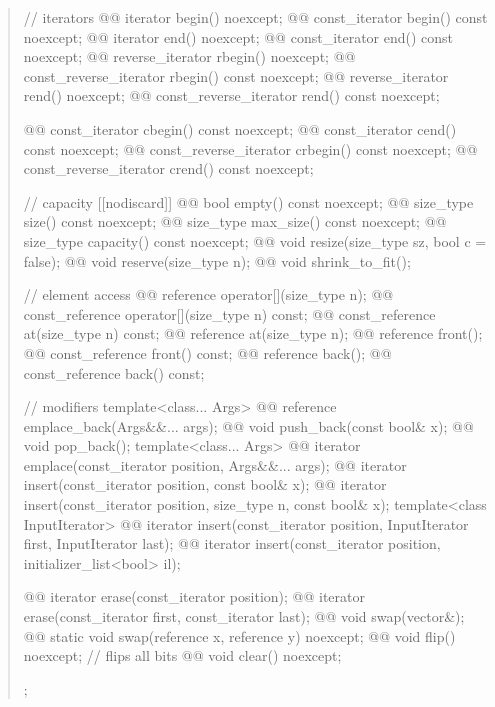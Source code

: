 \documentclass{wg21}
\begin{document}
\begin{quote}
\begin{codeblock}
{{    // iterators
    @@ iterator               begin() noexcept;
    @@ const_iterator         begin() const noexcept;
    @@ iterator               end() noexcept;
    @@ const_iterator         end() const noexcept;
    @@ reverse_iterator       rbegin() noexcept;
    @@ const_reverse_iterator rbegin() const noexcept;
    @@ reverse_iterator       rend() noexcept;
    @@ const_reverse_iterator rend() const noexcept;

    @@ const_iterator         cbegin() const noexcept;
    @@ const_iterator         cend() const noexcept;
    @@ const_reverse_iterator crbegin() const noexcept;
    @@ const_reverse_iterator crend() const noexcept;

    // capacity
    [[nodiscard]] @@ bool empty() const noexcept;
    @@ size_type size() const noexcept;
    @@ size_type max_size() const noexcept;
    @@ size_type capacity() const noexcept;
    @@ void      resize(size_type sz, bool c = false);
    @@ void      reserve(size_type n);
    @@ void      shrink_to_fit();

    // element access
    @@ reference       operator[](size_type n);
    @@ const_reference operator[](size_type n) const;
    @@ const_reference at(size_type n) const;
    @@ reference       at(size_type n);
    @@ reference       front();
    @@ const_reference front() const;
    @@ reference       back();
    @@ const_reference back() const;

    // modifiers
    template<class... Args> @@ reference emplace_back(Args&&... args);
    @@ void push_back(const bool& x);
    @@ void pop_back();
    template<class... Args> @@ iterator emplace(const_iterator position, Args&&... args);
    @@ iterator insert(const_iterator position, const bool& x);
    @@ iterator insert(const_iterator position, size_type n, const bool& x);
    template<class InputIterator>
      @@ iterator insert(const_iterator position, InputIterator first, InputIterator last);
    @@ iterator insert(const_iterator position, initializer_list<bool> il);

    @@ iterator erase(const_iterator position);
    @@ iterator erase(const_iterator first, const_iterator last);
    @@ void swap(vector&);
    @@ static void swap(reference x, reference y) noexcept;
    @@ void flip() noexcept;       // flips all bits
    @@ void clear() noexcept;
  };
}
\end{codeblock}%
\end{quote}
\end{document}
